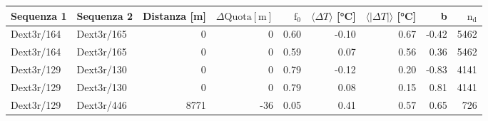 
\begin{tabular}[t]{llrrrrrrr}
\toprule
Sequenza 1 & Sequenza 2 & Distanza [m] & $\Delta \mathrm{Quota [m]}$ & $\mathrm{f}_0$ & $\langle \Delta T \rangle$ [°C] & $\langle \lvert \Delta T \rvert \rangle$ [°C] & b & $\mathrm{n_d}$\\
\midrule
Dext3r/164 & Dext3r/165 & 0 & 0 & 0.60 & -0.10 & 0.67 & -0.42 & 5462\\
Dext3r/164 & Dext3r/165 & 0 & 0 & 0.59 & 0.07 & 0.56 & 0.36 & 5462\\
Dext3r/129 & Dext3r/130 & 0 & 0 & 0.79 & -0.12 & 0.20 & -0.83 & 4141\\
Dext3r/129 & Dext3r/130 & 0 & 0 & 0.79 & 0.08 & 0.15 & 0.81 & 4141\\
Dext3r/129 & Dext3r/446 & 8771 & -36 & 0.05 & 0.41 & 0.57 & 0.65 & 726\\
\bottomrule
\end{tabular}